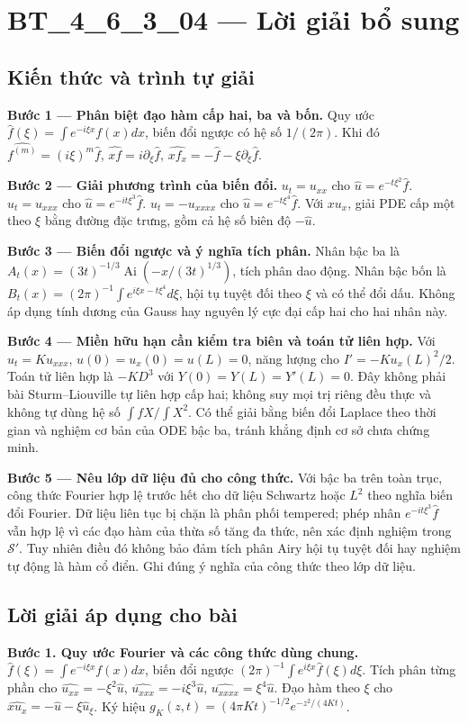 \documentclass[10pt,a4paper]{article}
\begin{document}
\section*{BT\_4\_6\_3\_04 — Lời giải bổ sung}
\subsection*{Kiến thức và trình tự giải}
\textbf{Bước 1 — Phân biệt đạo hàm cấp hai, ba và bốn.} Quy ước $\widehat f(\xi)=\int e^{-i\xi x}f(x)dx$, biến đổi ngược có hệ số $1/(2\pi)$. Khi đó $\widehat{f^{(m)}}=(i\xi)^m\widehat f$, $\widehat{xf}=i\partial_\xi\widehat f$, $\widehat{xf_x}=-\widehat f-\xi\partial_\xi\widehat f$.

\textbf{Bước 2 — Giải phương trình của biến đổi.} $u_t=u_{xx}$ cho $\widehat u=e^{-t\xi^2}\widehat f$. $u_t=u_{xxx}$ cho $\widehat u=e^{-it\xi^3}\widehat f$. $u_t=-u_{xxxx}$ cho $\widehat u=e^{-t\xi^4}\widehat f$. Với $xu_x$, giải PDE cấp một theo $\xi$ bằng đường đặc trưng, gồm cả hệ số biên độ $-\widehat u$.

\textbf{Bước 3 — Biến đổi ngược và ý nghĩa tích phân.} Nhân bậc ba là $A_t(x)=(3t)^{-1/3}\operatorname{Ai}(-x/(3t)^{1/3})$, tích phân dao động. Nhân bậc bốn là $B_t(x)=(2\pi)^{-1}\int e^{i\xi x-t\xi^4}d\xi$, hội tụ tuyệt đối theo $\xi$ và có thể đổi dấu. Không áp dụng tính dương của Gauss hay nguyên lý cực đại cấp hai cho hai nhân này.

\textbf{Bước 4 — Miền hữu hạn cần kiểm tra biên và toán tử liên hợp.} Với $u_t=Ku_{xxx}$, $u(0)=u_x(0)=u(L)=0$, năng lượng cho $I'=-K u_x(L)^2/2$. Toán tử liên hợp là $-KD^3$ với $Y(0)=Y(L)=Y'(L)=0$. Đây không phải bài Sturm–Liouville tự liên hợp cấp hai; không suy mọi trị riêng đều thực và không tự dùng hệ số $\int fX/\int X^2$. Có thể giải bằng biến đổi Laplace theo thời gian và nghiệm cơ bản của ODE bậc ba, tránh khẳng định cơ sở chưa chứng minh.

\textbf{Bước 5 — Nêu lớp dữ liệu đủ cho công thức.} Với bậc ba trên toàn trục, công thức Fourier hợp lệ trước hết cho dữ liệu Schwartz hoặc $L^2$ theo nghĩa biến đổi Fourier. Dữ liệu liên tục bị chặn là phân phối tempered; phép nhân $e^{-it\xi^3}\widehat f$ vẫn hợp lệ vì các đạo hàm của thừa số tăng đa thức, nên xác định nghiệm trong $\mathcal S\prime$. Tuy nhiên điều đó không bảo đảm tích phân Airy hội tụ tuyệt đối hay nghiệm tự động là hàm cổ điển. Ghi đúng ý nghĩa của công thức theo lớp dữ liệu.
\subsection*{Lời giải áp dụng cho bài}
\textbf{Bước 1. Quy ước Fourier và các công thức dùng chung.}
$\widehat f(\xi)=\int e^{-i\xi x}f(x)dx$, biến đổi ngược $(2\pi)^{-1}\int e^{i\xi x}\widehat f(\xi)d\xi$. Tích phân từng phần cho $\widehat{u_{xx}}=-\xi^2\widehat u$, $\widehat{u_{xxx}}=-i\xi^3\widehat u$, $\widehat{u_{xxxx}}=\xi^4\widehat u$. Đạo hàm theo $\xi$ cho $\widehat{xu_x}=-\widehat u-\xi\widehat u_\xi$. Ký hiệu $g_K(z,t)=(4\pi Kt)^{-1/2}e^{-z^2/(4Kt)}$.
\end{document}

